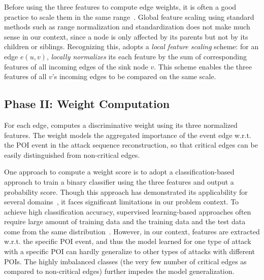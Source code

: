 Before using the three features to compute edge weights, it is often a good practice to scale them in the same range~\cite{mlbook,friedman2001elements}.
Global feature scaling using standard methods such as range normalization and standardization does not 
make much sense in our context, since a node is only affected by its parents but not by its children or siblings.
Recognizing this, \tool adopts a \emph{local feature scaling} scheme: for an edge $e(u, v)$, \tool \emph{locally normalizes} its each feature by the sum of corresponding features of all incoming edges of the sink node $v$. 
This scheme enables the three features of all $v$'s incoming edges to be compared on the same scale.






\subsection{Phase II: Weight Computation}
\label{subsec:weight-computation}


For each edge, \tool computes a discriminative weight using its three normalized features. The 
weight models the aggregated importance of the event edge w.r.t. the POI event in the attack sequence reconstruction, so that critical edges can be easily distinguished from non-critical edges.

One approach to compute a weight score is to adopt a classification-based approach to train a binary classifier using the three features and output a probability score.
Though this approach has demonstrated its applicability for several domains~\cite{gao2018sybilfuse,wang2018graph}, it faces significant limitations in our problem context.
To achieve high classification accuracy, supervised learning-based approaches often require large amount of training data and the training data and the test data come from the same distribution~\cite{mlbook,friedman2001elements}.
However, in our context, features are extracted w.r.t. the specific POI event, and thus the model learned for one type of attack with a specific POI can hardly generalize to other types of attacks with different POIs. 
The highly imbalanced classes (\ie the very few number of critical edges as compared to non-critical edges) further impedes the model generalization.

